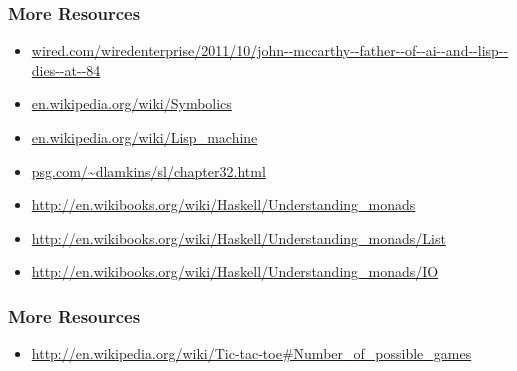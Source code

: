 \documentclass[]{beamer}
\begin{document}
\begin{frame}[fragile]
  \frametitle{More Resources}

  \begin{itemize}    
  \item \url{wired.com/wiredenterprise/2011/10/john--mccarthy--father--of--ai--and--lisp--dies--at--84}
  \item \url{en.wikipedia.org/wiki/Symbolics}
  \item \url{en.wikipedia.org/wiki/Lisp_machine}
  \item \url{psg.com/~dlamkins/sl/chapter32.html}
  \item \url{http://en.wikibooks.org/wiki/Haskell/Understanding_monads}
  \item \url{http://en.wikibooks.org/wiki/Haskell/Understanding_monads/List}
  \item \url{http://en.wikibooks.org/wiki/Haskell/Understanding_monads/IO}
  \end{itemize}
\end{frame}

\begin{frame}[fragile]
  \frametitle{More Resources}

  \begin{itemize}    
  \item \url{http://en.wikipedia.org/wiki/Tic-tac-toe#Number_of_possible_games}
  \end{itemize}

\end{frame}
\end{document}
